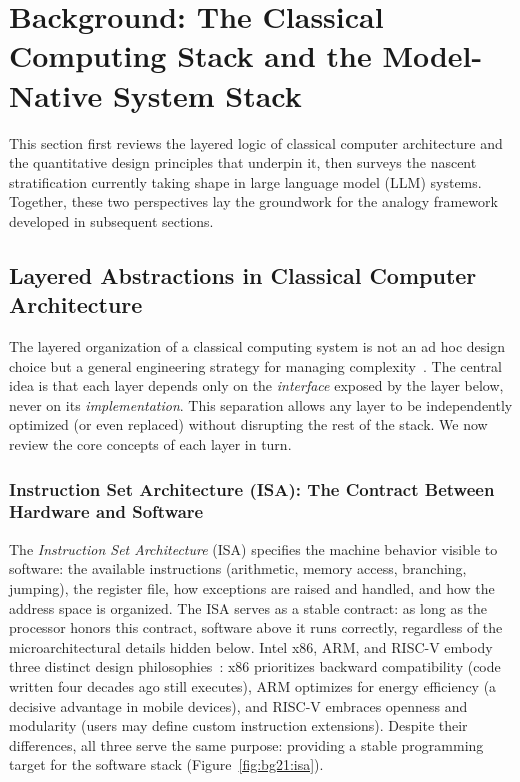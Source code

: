 \section{Background: The Classical Computing Stack and the Model-Native System Stack}
\label{sec:background}

This section first reviews the layered logic of classical computer architecture and the quantitative design principles that underpin it, then surveys the nascent stratification currently taking shape in large language model (LLM) systems. Together, these two perspectives lay the groundwork for the analogy framework developed in subsequent sections.

\subsection{Layered Abstractions in Classical Computer Architecture}

The layered organization of a classical computing system is not an ad hoc design choice but a general engineering strategy for managing complexity~\cite{hennessy2017quantitative}.
The central idea is that each layer depends only on the \emph{interface} exposed by the layer below, never on its \emph{implementation}.
This separation allows any layer to be independently optimized (or even replaced) without disrupting the rest of the stack.
We now review the core concepts of each layer in turn.

\subsubsection{Instruction Set Architecture (ISA): The Contract Between Hardware and Software}

The \textit{Instruction Set Architecture} (ISA) specifies the machine behavior visible to software: the available instructions (arithmetic, memory access, branching, jumping), the register file, how exceptions are raised and handled, and how the address space is organized.
The ISA serves as a stable contract: as long as the processor honors this contract, software above it runs correctly, regardless of the microarchitectural details hidden below.
Intel x86, ARM, and RISC-V embody three distinct design philosophies~\cite{intel_sdm_2026,riscv_spec_2026}: x86 prioritizes backward compatibility (code written four decades ago still executes), ARM optimizes for energy efficiency (a decisive advantage in mobile devices), and RISC-V embraces openness and modularity (users may define custom instruction extensions).
Despite their differences, all three serve the same purpose: providing a stable programming target for the software stack (Figure~\ref{fig:bg21:isa}).


